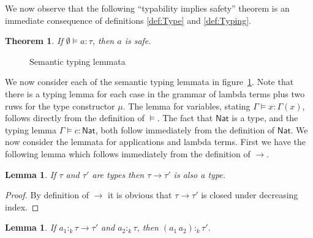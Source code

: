 \documentclass[12pt,a4paper,draft]{article}
\theoremstyle{definition}
\theoremstyle{plain}
\newtheorem{lemma}[definition]{Lemma}
\newtheorem{theorem}[definition]{Theorem}
\newcommand{\abstr}[2]{\ensuremath{\lambda{#1}.\,{#2}}}
\newcommand{\app}[2]{\ensuremath{{#1}\,{#2}}}
\newcommand{\Nat}{\ensuremath{\mathsf{Nat}}}
\begin{document}
We now observe that the following ``typability implies safety'' theorem is an immediate
consequence of definitions \ref{def:Type} and \ref{def:Typing}.
\begin{theorem}
  If $\emptyset \models a : \tau$, then $a$ is safe.
\end{theorem}

\begin{figure}[htb]
  \centering
  \caption{Semantic typing lemmata}
  \label{fig:Semantic_typing_lemmata}
\end{figure}

We now consider each of the semantic typing lemmata in figure~\ref{fig:Semantic_typing_lemmata}.
Note that there is a typing lemma for each case in the grammar of lambda terms plus two ruws
for the type constructor $\mu$. The lemma for variables, stating $\Gamma \models x : \Gamma(x)$,
follows directly from the definition of $\models$. The fact that $\Nat$ is a type, and the
typing lemma $\Gamma \models c : \Nat$, both follow immediately from the definition of $\Nat$.
We now consider the lemmata for applications and lambda terms. First we have the following
lemma which follows immediately from the definition of $\to$.
\begin{lemma}
  If $\tau$ and $\tau'$ are types then $\tau \to \tau'$ is also a type.
\end{lemma}

\begin{proof}
  By definition of $\to$ it is obvious that $\tau \to \tau'$ is closed
  under decreasing index.
\end{proof}

\begin{lemma} \label{lem:Application}
  If $a_1 :_k \tau \to \tau'$ and $a_2 :_k \tau$, then $(\app{a_1}{a_2}) :_k \tau'$.
\end{lemma}
\end{document}
